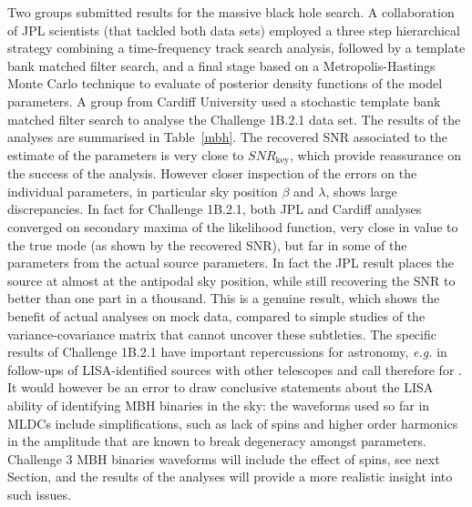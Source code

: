 \documentclass{iopart}
\begin{document}
Two groups submitted results for the massive black hole search. A collaboration of JPL scientists (that tackled both data sets) employed a three step hierarchical strategy combining a time-frequency track search analysis, followed by a template bank matched filter search, and a final stage based on a Metropolis-Hastings Monte Carlo technique to evaluate of posterior density functions of the model parameters. A group from Cardiff University used a stochastic template bank matched filter search\cite{cardiffmbh} to analyse the Challenge 1B.2.1 data set. The results of the analyses are summarised in Table~\ref{mbh}.  The recovered SNR associated to the estimate of the parameters is very close to $SNR_\mathrm{key}$, which provide reassurance on the success of the analysis. However closer inspection of the errors on the individual parameters, in particular sky position $\beta$ and $\lambda$, shows large discrepancies. In fact for Challenge 1B.2.1, both JPL and Cardiff analyses converged on secondary maxima of the likelihood function, very close in value to the true mode (as shown by the recovered SNR), but far in some of the parameters from the actual source parameters. In fact the JPL result places the source at almost at the antipodal sky position, while still recovering the SNR to better than one part in a thousand. This is a genuine result, which shows the benefit of actual analyses on mock data, compared to simple studies of the variance-covariance matrix that cannot uncover these subtleties. The specific results of Challenge 1B.2.1  have important repercussions for astronomy, \emph{e.g.} in follow-ups of LISA-identified sources with other telescopes and call therefore for . It would however be an error to draw conclusive statements about the LISA ability of identifying MBH binaries in the sky: the waveforms used so far in MLDCs include simplifications, such as lack of spins and higher order harmonics in the amplitude that are known to break degeneracy amongst parameters. Challenge 3 MBH binaries waveforms will include the effect of spins, see next Section, and the results of the analyses will provide a more realistic insight into such issues.
\end{document}
